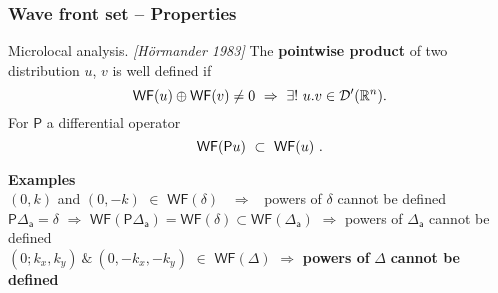 \documentclass[9pt]{beamer}
\newcommand{\WF}{\mathsf{WF}}
\newcommand{\citebeam}[1]{\textit{\textcolor{black!60!white}{[#1]}}}
\newcommand{\Psf}{\mathsf{P}}
\newcommand{\asf}{\mathsf{a}}
\begin{document}
\begin{frame}

\frametitle{Wave front set -- Properties}

\vfill

\begin{block}{Microlocal analysis. \citebeam{Hörmander 1983}}
The \textbf{pointwise product} of two distribution $u$, $v$ is well defined if 
\vspace*{-10pt}
\begin{equation*}
\WF(u) \oplus \WF(v) \neq 0 \ \Rightarrow \ \exists! \ u.v \in \mathcal{D}^{\prime}(\mathbb{R}^n). 
\vspace*{-10pt}
\end{equation*}
For $\Psf$ a differential operator
\vspace*{-12pt}
\begin{equation*}
\WF(\Psf u) \ \subset  \ \WF(u) \ .
\vspace*{-8pt}
\end{equation*}
\end{block}

\vfill

\textbf{Examples} \\[4pt]

$(0,k)$ and $(0,-k)$ $\in$ $\WF(\delta)$ \ $\Rightarrow$ \ powers of $\delta$ cannot be defined \\[3pt]
$\Psf \Delta_\asf = \delta$ $\Rightarrow$ $\WF(\Psf \Delta_\asf) = \WF(\delta) \subset \WF(\Delta_\asf)$ $\Rightarrow$ powers of $\Delta_\asf$ cannot be defined \\[8pt]

$(0;k_x,k_y) \ \& \ (0,-k_x,-k_y)$ $\in$ $\WF(\Delta)$ $\Rightarrow$ \textbf{powers of} $\Delta$ \textbf{cannot be defined} \ \textdbend

\vfill

\end{frame} 
\end{document}
